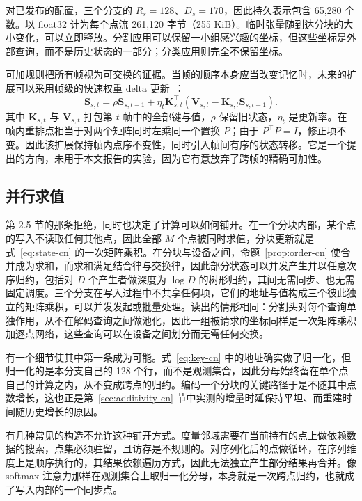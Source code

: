 \documentclass[UTF8,a4paper,11pt,fontset=windows]{ctexart}
\newcommand{\Sstate}{\mathbf{S}}
\begin{document}
对已发布的配置，三个分支的 $R_s=128$、$D_s=170$，因此持久表示包含 65,280 个数。以 float32 计为每个点流 261,120 字节（255 KiB）。临时张量随到达分块的大小变化，可以立即释放。分割应用可以保留一小组感兴趣的坐标，但这些坐标是外部查询，而不是历史状态的一部分；分类应用则完全不保留坐标。

可加规则把所有帧视为可交换的证据。当帧的顺序本身应当改变记忆时，未来的扩展可以采用帧级的快速权重 delta 更新~\cite{schlag2021linear}：
\begin{equation}
\Sstate_{s,t}=\rho\Sstate_{s,t-1}+\eta_t\bm K_{s,t}^{\top}
(\bm V_{s,t}-\bm K_{s,t}\Sstate_{s,t-1}).
\label{eq:delta-cn}
\end{equation}
其中 $\bm K_{s,t}$ 与 $\bm V_{s,t}$ 打包第 $t$ 帧中的全部键与值，$\rho$ 保留旧状态，$\eta_t$ 是更新率。在帧内重排点相当于对两个矩阵同时左乘同一个置换 $P$；由于 $P^\top P=I$，修正项不变。因此该扩展保持帧内点序不变性，同时引入帧间有序的状态转移。它是一个提出的方向，未用于本文报告的实验，因为它有意放弃了跨帧的精确可加性。

\subsection{并行求值}
\label{sec:parallel-eval-cn}
第 2.5 节的那条拒绝，同时也决定了计算可以如何铺开。在一个分块内部，某个点的写入不读取任何其他点，因此全部 $M$ 个点被同时求值，分块更新就是式~\eqref{eq:state-cn} 的一次矩阵乘积。在分块与设备之间，命题~\ref{prop:order-cn} 使合并成为求和，而求和满足结合律与交换律，因此部分状态可以并发产生并以任意次序归约，包括对 $D$ 个产生者做深度为 $\log D$ 的树形归约，其间无需同步、也无需固定调度。三个分支在写入过程中不共享任何项，它们的地址与值构成三个彼此独立的矩阵乘积，可以并发发起或批量处理。读出的情形相同：分割头对每个查询单独作用，从不在解码查询之间做池化，因此一组被请求的坐标同样是一次矩阵乘积加逐点网络，这些查询可以在设备之间划分而无需任何交换。

有一个细节使其中第一条成为可能。式~\eqref{eq:key-cn} 中的地址确实做了归一化，但归一化的是本分支自己的 128 个行，而不是观测集合，因此分母始终留在单个点自己的计算之内，从不变成跨点的归约。编码一个分块的关键路径于是不随其中点数增长，这也正是第~\ref{sec:additivity-cn} 节中实测的增量时延保持平坦、而重建时间随历史增长的原因。

有几种常见的构造不允许这种铺开方式。度量邻域需要在当前持有的点上做依赖数据的搜索，点集必须驻留，且访存是不规则的。对序列化后的点做循环，在序列维度上是顺序执行的，其结果依赖遍历方式，因此无法独立产生部分结果再合并。像 softmax 注意力那样在观测集合上取归一化分母，本身就是一次跨点归约，也就成了写入内部的一个同步点。
\end{document}

